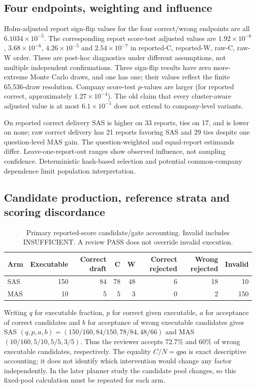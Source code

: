 \newpage
\subsection{Four endpoints, weighting and influence}



Holm-adjusted report sign-flip values for the four correct/wrong endpoints are all $6.1034\times10^{-5}$. The corresponding report score-test adjusted values are $1.92\times10^{-6}$, $3.68\times10^{-6}$, $4.26\times10^{-5}$ and $2.54\times10^{-7}$ in reported-C, reported-W, raw-C, raw-W order. These are post-hoc diagnostics under different assumptions, not multiple independent confirmations. Three sign-flip results have zero more-extreme Monte Carlo draws, and one has one; their values reflect the finite 65,536-draw resolution. Company score-test $p$-values are larger (for reported correct, approximately $1.27\times10^{-4}$). The old claim that every cluster-aware adjusted value is at most $6.1\times10^{-5}$ does not extend to company-level variants.

On reported correct delivery SAS is higher on 33 reports, ties on 17, and is lower on none; raw correct delivery has 21 reports favoring SAS and 29 ties despite one question-level MAS gain. The question-weighted and equal-report estimands differ. Leave-one-report-out ranges show observed influence, not sampling confidence. Deterministic hash-based selection and potential common-company dependence limit population interpretation.

\subsection{Candidate production, reference strata and scoring discordance}
\begin{table}[ht]\centering
\begin{tabular}{lrrrrrrr}\toprule
Arm & Executable & Correct draft & C & W & Correct rejected & Wrong rejected & Invalid\\\midrule
SAS & 150 & 84 & 78 & 48 & 6 & 18 & 10\\
MAS & 10 & 5 & 5 & 3 & 0 & 2 & 150\\\bottomrule
\end{tabular}
\caption{Primary reported-score candidate/gate accounting. Invalid includes INSUFFICIENT. A review PASS does not override invalid execution.}\label{tab:stage-account}
\end{table}

Writing $q$ for executable fraction, $p$ for correct given executable, $a$ for acceptance of correct candidates and $b$ for acceptance of wrong executable candidates gives SAS $(q,p,a,b)=(150/160,84/150,78/84,48/66)$ and MAS $(10/160,5/10,5/5,3/5)$. Thus the reviewer accepts 72.7\% and 60\% of wrong executable candidates, respectively. The equality $C/N=qpa$ is exact descriptive accounting; it does not identify which intervention would change any factor independently. In the later planner study the candidate pool changes, so this fixed-pool calculation must be repeated for each arm.

